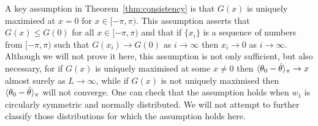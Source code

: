 \documentclass[journal]{IEEEtran}
\begin{document}

A key assumption in Theorem~\ref{thm:consistency} is that $G(x)$ is uniquely maximised at $x = 0$ for $x \in [-\pi, \pi)$.  This assumption asserts that $G(x) \leq G(0)$ for all $x \in [-\pi, \pi)$ and that if $\{x_i\}$ is a sequence of numbers from $[-\pi,\pi)$ such that $G(x_i) \rightarrow G(0)$ as $i \rightarrow \infty$ then $x_i \rightarrow 0$ as $i \rightarrow \infty$.  Although we will not prove it here, this assumption is not only sufficient, but also necessary, for if $G(x)$ is uniquely maximised at some $x \neq 0$ then $\langle \theta_0 - \hat{\theta} \rangle_\pi \rightarrow x$ almost surely as $L\rightarrow\infty$, while if $G(x)$ is not uniquely maximised then $\langle \theta_0 - \hat{\theta} \rangle_\pi$ will not converge.  One can check that the assumption holds when $w_1$ is circularly symmetric and normally distributed.  We will not attempt to further classify those distributions for which the assumption holds here.


\end{document}
